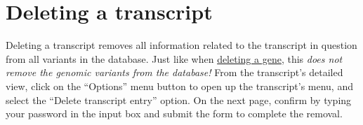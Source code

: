 \documentclass[a4paper,oneside,openany,12pt]{memoir}
\renewenvironment{leftbar}[1][\hsize]
{%
    \def\FrameCommand
    {%
        {\color{LOVDdark}\vrule width 3pt \hspace{5pt}}%
        \colorbox{LOVDlight}%
    }%
    \MakeFramed{\hsize#1\advance\hsize-\width\FrameRestore}%
}
{\endMakeFramed}
\begin{document}
\section{Deleting a transcript}
Deleting a transcript removes all information related to the transcript in question from all variants in the database.
Just like when \hyperlink{s_gene_delete}{deleting a gene}, this \emph{does not remove the genomic variants from the database!}
From the transcript's detailed view, click on the ``Options'' menu button to open up the transcript's menu, and select the ``Delete transcript entry'' option.
On the next page, confirm by typing your password in the input box and submit the form to complete the removal.
\end{document}
